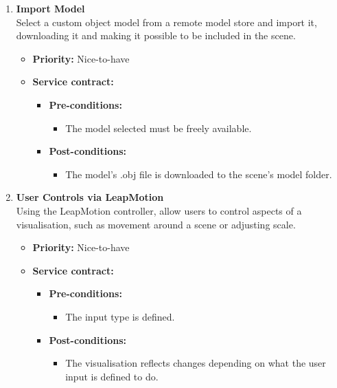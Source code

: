 \documentclass[a4paper,12pt]{article}
\begin{document}
\begin{enumerate}
			\item {\large \textbf{Import Model}}\\
			Select a custom object model from a remote model store and import it, downloading it and making it possible to be included in the scene.
			\begin{itemize}
				\item \textbf{Priority:} Nice-to-have
				\item \textbf{Service contract:}
				\begin{itemize}
					\item \textbf{Pre-conditions:}
						\begin{itemize}
							\item The model selected must be freely available.
						\end{itemize}
					\item \textbf{Post-conditions:}
						\begin{itemize}
							\item The model's .obj file is downloaded to the scene's model folder.
						\end{itemize}
				\end{itemize}
			\end{itemize}
			
			\item {\large \textbf{User Controls via LeapMotion}}\\
			Using the LeapMotion controller, allow users to control aspects of a visualisation, such as movement around a scene or adjusting scale.
			\begin{itemize}
				\item \textbf{Priority:} Nice-to-have
				\item \textbf{Service contract:}
				\begin{itemize}
					\item \textbf{Pre-conditions:}
						\begin{itemize}
							\item The input type is defined.
						\end{itemize}
					\item \textbf{Post-conditions:}
						\begin{itemize}
							\item The visualisation reflects changes depending on what the user input is defined to do. 
						\end{itemize}
				\end{itemize}
			\end{itemize}
		\end{enumerate}
%
%
\end{document}
